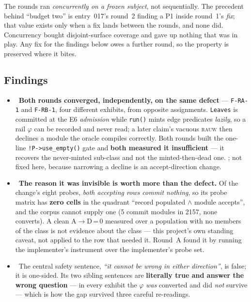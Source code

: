 The rounds ran \emph{concurrently on a frozen subject}, not sequentially. The precedent behind
``budget two'' is entry~017's round~2 finding a P1 inside round~1's \emph{fix}; that value
exists only when a fix lands between the rounds, and none did. Concurrency bought
disjoint-surface coverage and gave up nothing that was in play. Any fix for the findings below
owes a further round, so the property is preserved where it bites.

\subsection*{Findings}
\begin{itemize}
  \item \foverdecline\ \textbf{Both rounds converged, independently, on the same defect} ---
        \texttt{F-RA-1} and \texttt{F-RB-1}, four different exhibits, from opposite
        assignments. \texttt{Leaves} is committed at the E6 \emph{admission} while
        \texttt{run()} mints edge predicates \emph{lazily}, so a rail \(\varphi\) can be
        recorded and never read; a later claim's vacuous \textsc{rauw} then declines a module
        the oracle compiles correctly. Both rounds built the one-line \texttt{!P->use\_empty()}
        gate and \textbf{both measured it insufficient} --- it recovers the never-minted
        sub-class and not the minted-then-dead one. ; not fixed
        here, because narrowing a decline is an accept-direction change.
  \item \fdoc\ \textbf{The reason it was invisible is worth more than the defect.} Of the
        change's eight probes, \emph{both accepting rows commit nothing}, so its probe matrix
        has \textbf{zero cells} in the quadrant ``record populated \(\wedge\) module accepts'',
        and the corpus cannot supply one (5 commit modules in 2157, none converts). A clean
        A\(\rightarrow\)D\,=\,0 measured over a population with no members of the
        class is not evidence about the class --- this project's own standing caveat, not
        applied to the row that needed it. Round~A found it by running the implementer's
        instrument over the implementer's probe set.
  \item \fdoc\ The central safety sentence, \emph{``it cannot be wrong in either direction''},
        is false; it is one-sided. Its two sibling sentences are \textbf{literally true and
        answer the wrong question} --- in every exhibit the \(\varphi\) \emph{was} converted
        and did \emph{not} survive --- which is how the gap survived three careful re-readings.

\end{itemize}

